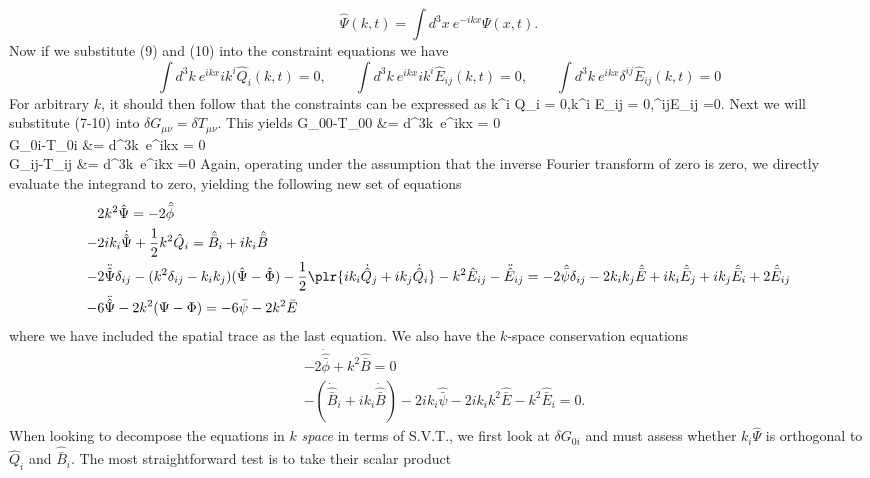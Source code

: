 \documentclass[10pt,letterpaper]{article}
\begin{document}
\[
	\hat \Psi(k,t) = \int d^3x\ e^{-ikx} \Psi(x,t).
\]
Now if we substitute (9) and (10) into the constraint equations we have
\[
	\int d^3k\  e^{ikx} ik^i \hat Q_i(k,t) = 0, \qquad \int d^3k\  e^{ikx} ik^i \hat E_{ij}(k,t) = 0,\qquad \int d^3k\  e^{ikx} \delta^{ij} \hat E_{ij}(k,t) = 0
\]
For arbitrary $k$, it should then follow that the constraints can be expressed as
\be
	k^i \hat Q_i = 0,\qquad k^i \hat E_{ij} = 0,\qquad \delta^{ij}\hat E_{ij} =0.
\ee
Next we will substitute (7-10) into $\delta G_{\mu\nu} = \delta T_{\mu\nu}$. This yields
\ba
	\delta G_{00}-\delta T_{00} &= \int d^3k\ e^{ikx}  = 0\\
	\delta G_{0i}-\delta T_{0i} &= \int d^3k\ e^{ikx}  = 0\\
	\delta G_{ij}-\delta T_{ij} &= \int d^3k\ e^{ikx} =0
\ea
Again, operating under the assumption that the inverse Fourier transform of zero is zero, we directly evaluate the integrand to zero, yielding the following new set of equations
\begin{align}
	&2k^2 \hat \Psi = -2\hat{\bar \phi} \\
	 -&2 ik_i \dot{\hat  \Psi} +\frac12 k^2 \hat Q_i= \hat{\bar B}_i+ik_i \hat{\bar B}\\
	  -&2 \ddot{\hat \Psi} \delta_{ij} - (k^2 \delta_{ij} - k_ik_j)(\hat \Psi - \hat \Phi)
	-\frac12\plr{ ik_i \dot{\hat Q}_j + ik_j \dot{\hat {Q}}_i} - k^2 \hat E_{ij} - \ddot {\hat{E}}_{ij}=-2\hat{\bar \psi}\delta_{ij} - 2k_ik_j \hat{\bar E} + ik_i \hat{\bar E}_j + ik_j \hat{\bar E}_i + 2\hat{\bar E}_{ij}\\
 -&6\ddot{\hat \Psi} - 2k^2(\Psi-\Phi) = -6\bar\psi - 2k^2\bar E
\end{align}
where we have included the spatial trace as the last equation. We also have the $k$-space conservation equations
\begin{align}
	&-2\dot{\hat{\bar{\phi}}} + k^2 \hat{\bar B} = 0\\
&-(\dot{\hat{\bar{B}}}_i + ik_i \dot{\hat{\bar B}}) - 2ik_i \hat{\bar\psi} - 2ik_ik^2\hat{\bar E} - k^2 \hat{\bar{E}}_i = 0.
\end{align}
When looking to decompose the equations in $k$ \emph{space} in terms of S.V.T., we first look at $\delta G_{0i}$ and must assess whether $k_i \hat \Psi$ is orthogonal to $\hat Q_i$ and $\hat{\bar B}_i$. The most straightforward test is to take their scalar product
\end{document}
